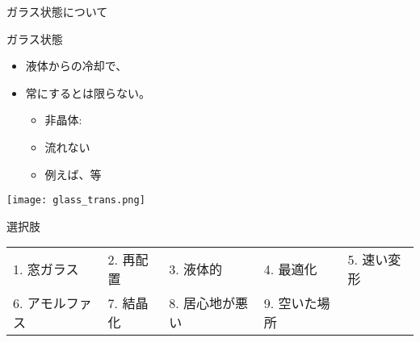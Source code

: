 \documentclass[uplatex,dvipdfmx,a4paper,11pt]{jsarticle}
\begin{document}
\begin{qlist}
\begin{qlist2}
			\qitem ガラス状態について
				\begin{center}
					\begin{minipage}{0.46\textwidth}
						\begin{itembox}[l]{ガラス状態}
							\begin{itemize}
								\item 液体からの冷却で、
								\item 常に\qbox{}するとは限らない。
								\begin{itemize}
									\item 非晶体:\qbox{}
									\item 流れない
									\item 例えば、\qbox{}等
								\end{itemize}
							\end{itemize}
						\end{itembox}
					\end{minipage}
					\begin{minipage}{0.4\textwidth}
						\begin{center}
						\texttt{[image: glass\_trans.png]}
						\end{center}
					\end{minipage}
				\end{center}
		\end{qlist2}

		\begin{itembox}[l]{選択肢}
			\begin{center}
				\begin{tabular}{lllll}
					1. 窓ガラス	&2. 再配置	&3. 液体的	&4. 最適化	&5. 速い変形\\
					6. アモルファス	&7. 結晶化		&8. 居心地が悪い	&9. 空いた場所
				\end{tabular}
			\end{center}
		\end{itembox}
\end{qlist}
\end{document}
